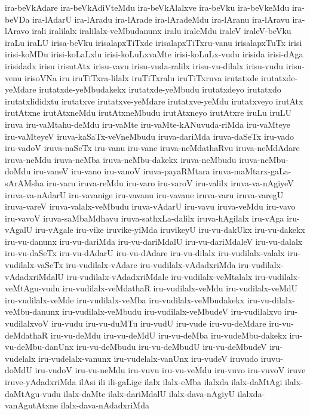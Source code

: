 {ira-beVkAdare
ira-beVkAdiVteMdu
ira-beVkAlalxve
ira-beVku
ira-beVkeMdu
ira-beVDa
ira-lAdarU
ira-lAradu
ira-lArade
ira-lAradeMdu
ira-lAranu
ira-lAravu
ira-lAravo
irali
iralilalx
iralilalx-veMbudanunx
iralu
iraleMdu
iraleV
iraleV-beVku
iraLu
iraLU
irisa-beVku
irisalapxTiTxde
irisalapxTiTxru-vanu
irisalapxTuTx
irisi
irisi-koMDu
irisi-koLaLxlu
irisi-koLuLxvaMte
irisi-koLuLx-vudu
irisida
irisi-dAga
irisidadx
irisu
irisutAtx
irisu-vavu
irisu-vuda-ralilx
irisu-vu-dilalx
irisu-vudu
irisu-venu
irisoVNa
iru
iruTiTxra-lilalx
iruTiTxralu
iruTiTxruva
irutatxde
irutatxde-yeMdare
irutatxde-yeMbudakekx
irutatxde-yeMbudu
irutatxdeyo
irutatxdo
irutatxlididxtu
irutatxve
irutatxve-yeMdare
irutatxve-yeMdu
irutatxveyo
irutAtx
irutAtxne
irutAtxneMdu
irutAtxneMbudu
irutAtxneyo
irutAtxre
iruLu
iruLU
iruva
iru-vaMtahu-deMdu
iru-vaMte
iru-vaMte-kANuvuda-riMda
iru-vaMteye
iru-vaMteyeV
iruva-kaSaTx-veVneMbudu
iruva-dariMda
iruva-daSeTx
iru-vado
iru-vadoV
iruva-naSeTx
iru-vanu
iru-vane
iruva-neMdathaRvu
iruva-neMdAdare
iruva-neMdu
iruva-neMba
iruva-neMbu-dakekx
iruva-neMbudu
iruva-neMbu-doMdu
iru-vaneV
iru-vano
iru-vanoV
iruva-payaRMtara
iruva-maMtarx-gaLa-sArAMsha
iru-varu
iruva-reMdu
iru-varo
iru-varoV
iru-valilx
iruva-va-nAgiyeV
iruva-va-nAdarU
iru-vavanige
iru-vavanu
iru-vavane
iruva-varu
iruva-varegU
iruva-vareV
iruva-valalx-veMbudu
iruva-vAdarU
iru-vavu
iruva-veMdu
iru-vavo
iru-vavoV
iruva-saMbaMdhavu
iruva-sathxLa-dalilx
iruva-hAgilalx
iru-vAga
iru-vAgalU
iru-vAgale
iru-vike
iruvike-yiMda
iruvikeyU
iru-vu-dakUkx
iru-vu-dakekx
iru-vu-danunx
iru-vu-dariMda
iru-vu-dariMdalU
iru-vu-dariMdaleV
iru-vu-dalalx
iru-vu-daSeTx
iru-vu-dAdarU
iru-vu-dAdare
iru-vu-dilalx
iru-vudilalx-valalx
iru-vudilalx-vaSeTx
iru-vudilalx-vAdare
iru-vudilalx-vAdadxriMda
iru-vudilalx-vAdadxriMdalU
iru-vudilalx-vAdadxriMdale
iru-vudilalx-veMtalalx
iru-vudilalx-veMtAgu-vudu
iru-vudilalx-veMdathaR
iru-vudilalx-veMdu
iru-vudilalx-veMdU
iru-vudilalx-veMde
iru-vudilalx-veMba
iru-vudilalx-veMbudakekx
iru-vu-dilalx-veMbu-danunx
iru-vudilalx-veMbudu
iru-vudilalx-veMbudeV
iru-vudilalxvo
iru-vudilalxvoV
iru-vudu
iru-vu-duMTu
iru-vudU
iru-vude
iru-vu-deMdare
iru-vu-deMdathaR
iru-vu-deMdu
iru-vu-deMdU
iru-vu-deMba
iru-vudeMbu-dakekx
iru-vu-deMbu-danUnx
iru-vu-deMbudu
iru-vu-deMbudU
iru-vu-deMbudeV
iru-vudelalx
iru-vudelalx-vanunx
iru-vudelalx-vanUnx
iru-vudeV
iruvudo
iruvu-doMdU
iru-vudoV
iru-vu-neMdu
iru-vuvu
iru-vu-veMdu
iru-vuvo
iru-vuvoV
iruve
iruve-yAdadxriMda
ilAsi
ili
ili-gaLige
ilalx
ilalx-eMba
ilalxda
ilalx-daMtAgi
ilalx-daMtAgu-vudu
ilalx-daMte
ilalx-dariMdalU
ilalx-dava-nAgiyU
ilalxda-vanAgutAtxne
ilalx-dava-nAdadxriMda
}
